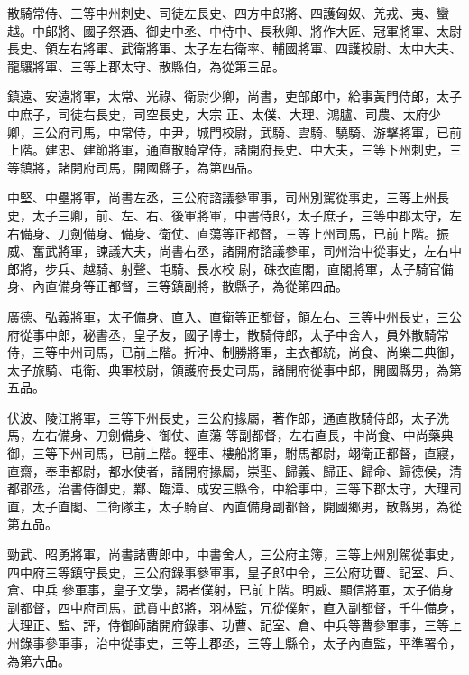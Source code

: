 \begin{pinyinscope}
 散騎常侍、三等中州刺史、司徒左長史、四方中郎將、四護匈奴、羌戎、夷、蠻越。中郎將、國子祭酒、御史中丞、中侍中、長秋卿、將作大匠、冠軍將軍、太尉長史、領左右將軍、武衛將軍、太子左右衛率、輔國將軍、四護校尉、太中大夫、龍驤將軍、三等上郡太守、散縣伯，為從第三品。



 鎮遠、安遠將軍，太常、光祿、衛尉少卿，尚書，吏部郎中，給事黃門侍郎，太子中庶子，司徒右長史，司空長史，大宗
 正、太僕、大理、鴻臚、司農、太府少卿，三公府司馬，中常侍，中尹，城門校尉，武騎、雲騎、驍騎、游擊將軍，已前上階。建忠、建節將軍，通直散騎常侍，諸開府長史、中大夫，三等下州刺史，三等鎮將，諸開府司馬，開國縣子，為第四品。



 中堅、中壘將軍，尚書左丞，三公府諮議參軍事，司州別駕從事史，三等上州長史，太子三卿，前、左、右、後軍將軍，中書侍郎，太子庶子，三等中郡太守，左右備身、刀劍備身、備身、衛仗、直蕩等正都督，三等上州司馬，已前上階。振威、奮武將軍，諫議大夫，尚書右丞，諸開府諮議參軍，司州治中從事史，左右中郎將，步兵、越騎、射聲、屯騎、長水校
 尉，硃衣直閣，直閣將軍，太子騎官備身、內直備身等正都督，三等鎮副將，散縣子，為從第四品。



 廣德、弘義將軍，太子備身、直入、直衛等正都督，領左右、三等中州長史，三公府從事中郎，秘書丞，皇子友，國子博士，散騎侍郎，太子中舍人，員外散騎常侍，三等中州司馬，已前上階。折沖、制勝將軍，主衣都統，尚食、尚樂二典御，太子旅騎、屯衛、典軍校尉，領護府長史司馬，諸開府從事中郎，開國縣男，為第五品。



 伏波、陵江將軍，三等下州長史，三公府掾屬，著作郎，通直散騎侍郎，太子洗馬，左右備身、刀劍備身、御仗、直蕩
 等副都督，左右直長，中尚食、中尚藥典御，三等下州司馬，已前上階。輕車、樓船將軍，駙馬都尉，翊衛正都督，直寢，直齋，奉車都尉，都水使者，諸開府掾屬，崇聖、歸義、歸正、歸命、歸德侯，清都郡丞，治書侍御史，鄴、臨漳、成安三縣令，中給事中，三等下郡太守，大理司直，太子直閣、二衛隊主，太子騎官、內直備身副都督，開國鄉男，散縣男，為從第五品。



 勁武、昭勇將軍，尚書諸曹郎中，中書舍人，三公府主簿，三等上州別駕從事史，四中府三等鎮守長史，三公府錄事參軍事，皇子郎中令，三公府功曹、記室、戶、倉、中兵
 參軍事，皇子文學，謁者僕射，已前上階。明威、顯信將軍，太子備身副都督，四中府司馬，武賁中郎將，羽林監，冗從僕射，直入副都督，千牛備身，大理正、監、評，侍御師諸開府錄事、功曹、記室、倉、中兵等曹參軍事，三等上州錄事參軍事，治中從事史，三等上郡丞，三等上縣令，太子內直監，平準署令，為第六品。




\end{pinyinscope}
